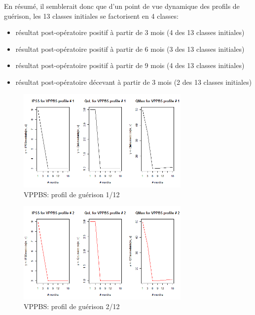 En résumé, il semblerait donc que d'un point de vue dynamique des profils de guérison, les 13 classes initiales se factorisent en 4 classes:
\begin{itemize}
\item résultat post-opératoire positif à partir de 3 mois (4 des 13 classes initiales)
\item résultat post-opératoire positif à partir de 6 mois (3 des 13 classes initiales)
\item résultat post-opératoire positif à partir de 9 mois (4 des 13 classes initiales)
\item résultat post-opératoire décevant à partir de 3 mois (2 des 13 classes initiales)
\end{itemize}

%

\begin{figure}[H]
\centering
\includegraphics[width=0.75\textwidth]{../Fig/VPPBS/vppbs-profil-post-01.png}
\caption{VPPBS: profil de guérison 1/12}
\end{figure}

\begin{figure}[H]
\centering
\includegraphics[width=0.75\textwidth]{../Fig/VPPBS/vppbs-profil-post-02.png}
\caption{VPPBS: profil de guérison 2/12}
\end{figure}

